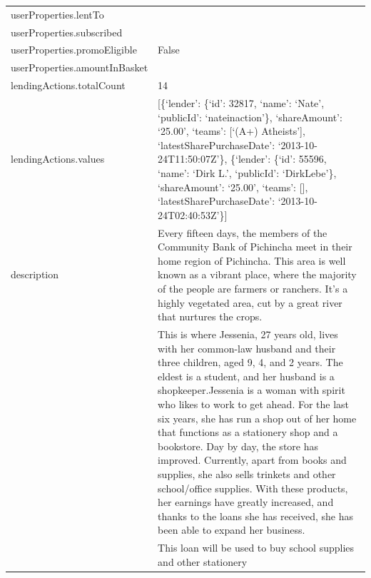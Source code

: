 \begin{longtable}{|p{}|p{}|}
	userProperties.lentTo                &                                                                     \\
	userProperties.subscribed            &                                                                     \\
	userProperties.promoEligible         & False                                                               \\
	userProperties.amountInBasket        &                                                                     \\
	lendingActions.totalCount            & 14                                                                  \\
	lendingActions.values                & {[}\{`lender': \{`id': 32817, `name': `Nate',
	`publicId': `nateinaction'\}, `shareAmount': `25.00', `teams': {[}`(A+)
	Atheists'{]}, `latestSharePurchaseDate': `2013-10-24T11:50:07Z'\},
	\{`lender': \{`id': 55596, `name': `Dirk L.', `publicId': `DirkLebe'\},
	`shareAmount': `25.00', `teams': {[}{]}, `latestSharePurchaseDate':
	`2013-10-24T02:40:53Z'\}{]}                                                                                \\
	description                          & Every fifteen days, the members of the Community Bank of
	Pichincha meet in their home region of Pichincha. This area is well
	known as a vibrant place, where the majority of the people are farmers
	or ranchers. It's a highly vegetated area, cut by a great river that
	nurtures the crops.                                                                                        \\
	                                     & This is where Jessenia, 27 years old, lives with her common-law
	husband and their three children, aged 9, 4, and 2 years. The eldest is
	a student, and her husband is a shopkeeper.Jessenia is a woman with
	spirit who likes to work to get ahead. For the last six years, she has
	run a shop out of her home that functions as a stationery shop and a
	bookstore. Day by day, the store has improved. Currently, apart from
	books and supplies, she also sells trinkets and other school/office
	supplies. With these products, her earnings have greatly increased, and
	thanks to the loans she has received, she has been able to expand her
	business.                                                                                                  \\
	                                     & This loan will be used to buy school supplies and other stationery

\end{longtable}
